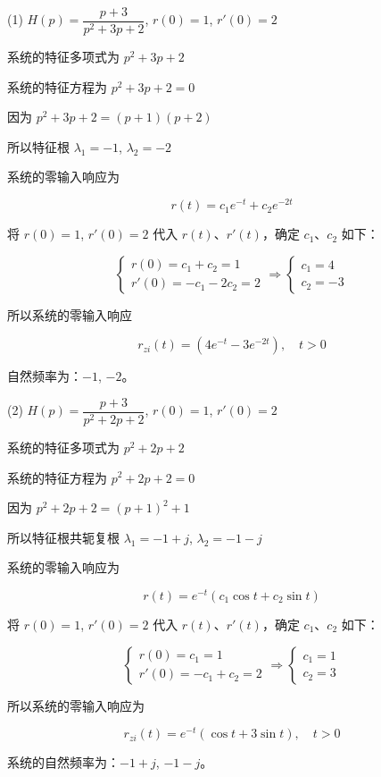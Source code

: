 \documentclass[UTF8]{ctexart}
\begin{document}
\begin{solution}
(1) $H(p)=\dfrac{p+3}{p^2+3p+2}$, $r(0)=1$, $r'(0)=2$

系统的特征多项式为 $p^2+3p+2$

系统的特征方程为 $p^2+3p+2=0$

因为 $p^2+3p+2=(p+1)(p+2)$

所以特征根 $\lambda_1=-1$, $\lambda_2=-2$

系统的零输入响应为

$$
r(t)=c_1 e^{-t}+c_2 e^{-2t}
$$

将 $r(0)=1$, $r'(0)=2$ 代入 $r(t)$、$r'(t)$，确定 $c_1$、$c_2$ 如下：

$$
\begin{cases} r(0)=c_1+c_2=1 \\ r'(0)=-c_1-2c_2=2 \end{cases} \Rightarrow \begin{cases} c_1=4 \\ c_2=-3 \end{cases}
$$

所以系统的零输入响应

$$
r_{zi}(t)=(4e^{-t}-3e^{-2t}), \quad t>0
$$

自然频率为：$-1$, $-2$。

\bigskip

(2) $H(p)=\dfrac{p+3}{p^2+2p+2}$, $r(0)=1$, $r'(0)=2$

系统的特征多项式为 $p^2+2p+2$

系统的特征方程为 $p^2+2p+2=0$

因为 $p^2+2p+2=(p+1)^2+1$

所以特征根共轭复根 $\lambda_1=-1+j$, $\lambda_2=-1-j$

系统的零输入响应为

$$
r(t)=e^{-t}(c_1 \cos t+c_2 \sin t)
$$

将 $r(0)=1$, $r'(0)=2$ 代入 $r(t)$、$r'(t)$，确定 $c_1$、$c_2$ 如下：

$$
\begin{cases} r(0)=c_1=1 \\ r'(0)=-c_1+c_2=2 \end{cases} \Rightarrow \begin{cases} c_1=1 \\ c_2=3 \end{cases}
$$

所以系统的零输入响应为

$$
r_{zi}(t)=e^{-t}(\cos t+3\sin t), \quad t>0
$$

系统的自然频率为：$-1+j$, $-1-j$。


\end{solution}
\end{document}
